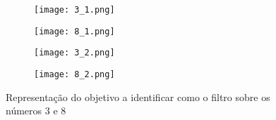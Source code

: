   \begin{figure}[H]

      \captionsetup{justification=centering}
      \begin{subfigure}{.5\textwidth}
        \centering
        \texttt{[image: 3\_1.png]}
        \end{subfigure}
        \begin{subfigure}{.5\textwidth}
        \centering
         \texttt{[image: 8\_1.png]}
      \end{subfigure}
      \begin{subfigure}{.5\textwidth}
        \centering
        \texttt{[image: 3\_2.png]}
        \end{subfigure}
        \begin{subfigure}{.5\textwidth}
        \centering
         \texttt{[image: 8\_2.png]}
      \end{subfigure}
      \caption {Representação do objetivo a identificar como o filtro sobre os números 3 e 8}
  \end{figure}

